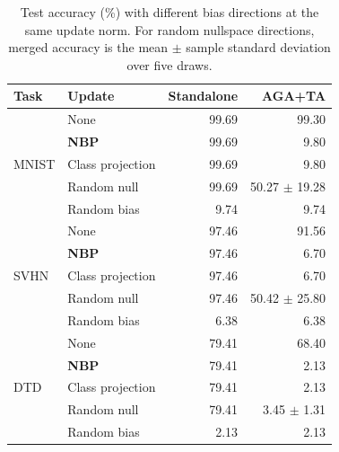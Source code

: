 \begin{table}[!htbp]
\centering
\small
\setlength{\tabcolsep}{4pt}
\caption{Test accuracy (\%) with different bias directions at the same update norm. For random nullspace directions, merged accuracy is the mean $\pm$ sample standard deviation over five draws.}
\label{tab:ablation}
\begin{tabular}{llrr}
\toprule
Task & Update & Standalone & AGA+TA \\
\midrule
\multirow{5}{*}{MNIST} & None & 99.69 & 99.30 \\
 & \textbf{NBP} & 99.69 & 9.80 \\
 & Class projection & 99.69 & 9.80 \\
 & Random null & 99.69 & 50.27 $\pm$ 19.28 \\
 & Random bias & 9.74 & 9.74 \\
\midrule
\multirow{5}{*}{SVHN} & None & 97.46 & 91.56 \\
 & \textbf{NBP} & 97.46 & 6.70 \\
 & Class projection & 97.46 & 6.70 \\
 & Random null & 97.46 & 50.42 $\pm$ 25.80 \\
 & Random bias & 6.38 & 6.38 \\
\midrule
\multirow{5}{*}{DTD} & None & 79.41 & 68.40 \\
 & \textbf{NBP} & 79.41 & 2.13 \\
 & Class projection & 79.41 & 2.13 \\
 & Random null & 79.41 & 3.45 $\pm$ 1.31 \\
 & Random bias & 2.13 & 2.13 \\
\bottomrule
\end{tabular}
\end{table}
